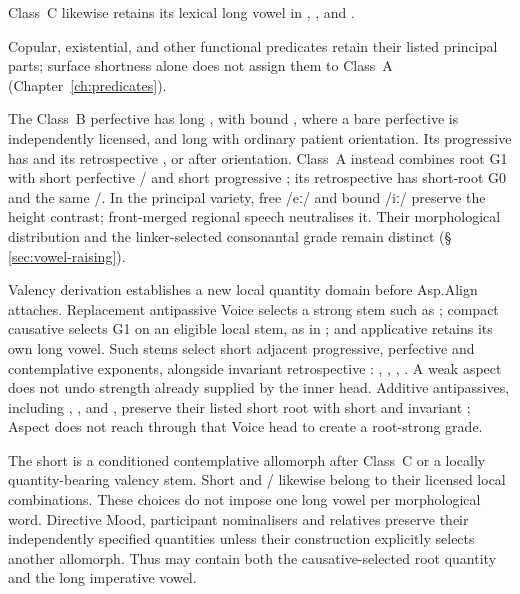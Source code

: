 Class~C  likewise retains its lexical long vowel in
, , and .

Copular, existential, and other functional predicates retain their listed
principal parts; surface shortness alone does not assign them to Class~A
(Chapter~\ref{ch:predicates}).

The Class~B perfective has long , with bound ,
where a bare perfective is independently licensed, and long 
with ordinary patient orientation. Its progressive has 
and its retrospective , or  after orientation.
Class~A instead combines root G1 with short perfective
/ and short progressive ; its
retrospective has short-root G0 and the same /.
In the principal variety, free  /eː/ and bound 
/iː/ preserve the height contrast; front-merged regional speech neutralises
it. Their morphological distribution and the linker-selected
consonantal grade remain distinct (§\,\ref{sec:vowel-raising}).

Valency derivation establishes a new local quantity domain before
Asp.Align attaches. Replacement antipassive Voice selects a strong
stem such as ; compact causative  selects G1
on an eligible local stem, as in ; and applicative
 retains its own long vowel. Such stems select short
adjacent progressive, perfective and contemplative exponents, alongside
invariant retrospective : , ,
, . A weak aspect does not undo
strength already supplied by the inner head. Additive antipassives,
including , , and , preserve their
listed short root with short  and invariant ; Aspect does not
reach through that Voice head to create a root-strong grade.

The short  is a conditioned contemplative allomorph after
Class~C or a locally quantity-bearing valency stem. Short
 and / likewise belong
to their licensed local combinations. These choices do not impose
one long vowel per morphological word. Directive Mood, participant
nominalisers and relatives preserve their independently
specified quantities unless their construction explicitly selects
another allomorph. Thus  may contain both the
causative-selected root quantity and the long imperative vowel.

